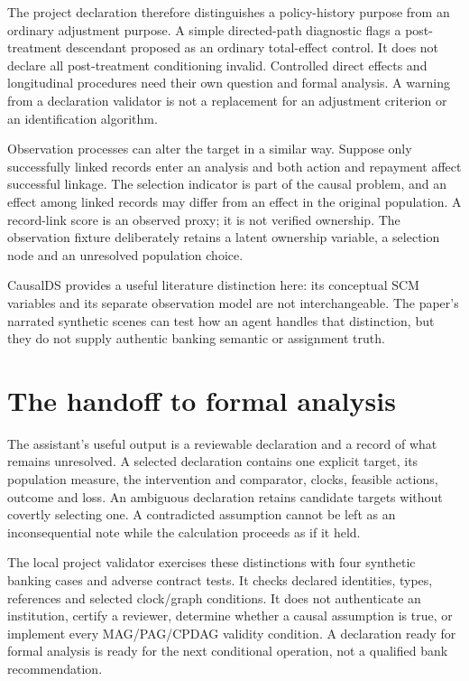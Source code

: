 The project declaration therefore distinguishes a policy-history purpose
from an ordinary adjustment purpose. A simple directed-path diagnostic flags
a post-treatment descendant proposed as an ordinary total-effect control.
It does not declare all post-treatment conditioning invalid. Controlled
direct effects and longitudinal procedures need their own question and
formal analysis. A warning from a declaration validator is not a replacement
for an adjustment criterion or an identification algorithm.

Observation processes can alter the target in a similar way. Suppose only
successfully linked records enter an analysis and both action and repayment
affect successful linkage. The selection indicator is part of the causal
problem, and an effect among linked records may differ from an effect in the
original population. A record-link score is an observed proxy; it is not
verified ownership. The observation fixture deliberately retains a latent
ownership variable, a selection node and an unresolved population choice.

CausalDS provides a useful literature distinction here: its conceptual SCM
variables and its separate observation model are not interchangeable. The
paper's narrated synthetic scenes can test how an agent handles that
distinction, but they do not supply authentic banking semantic or assignment
truth. \cite{v12_la_2607_08093}

\section{The handoff to formal analysis}

The assistant's useful output is a reviewable declaration and a record of
what remains unresolved. A selected declaration contains one explicit target,
its population measure, the intervention and comparator, clocks, feasible
actions, outcome and loss. An ambiguous declaration retains candidate targets
without covertly selecting one. A contradicted assumption cannot be left as
an inconsequential note while the calculation proceeds as if it held.

The local project validator exercises these distinctions with four synthetic
banking cases and adverse contract tests. It checks declared identities,
types, references and selected clock/graph conditions. It does not authenticate
an institution, certify a reviewer, determine whether a causal assumption is
true, or implement every MAG/PAG/CPDAG validity condition. A declaration ready
for formal analysis is ready for the next conditional operation, not a
qualified bank recommendation.

